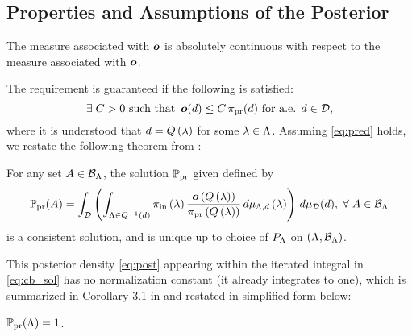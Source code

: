 \subsection{Properties and Assumptions of the Posterior}
\begin{frame}[t]
\begin{assumption}\label{as:pred}
The measure associated with $\operatorname*{\boldsymbol{o}}$ is absolutely continuous with respect to the measure associated with $\operatorname*{\boldsymbol{o}}$.
\end{assumption}


The requirement is guaranteed if the following is satisfied:
\begin{equation}\label{eq:pred}
\exists \; C>0 \text{ such that } \operatorname*{\boldsymbol{o}} (d) \leq C \operatorname*{\pi_{pr}}(d) \text{ for a.e. } d\in \mathcal{D},
\end{equation}
where it is understood that $d = Q\left ( \lambda \right )$ for some $\lambda \in {\Lambda}$.
Assuming \eqref{eq:pred} holds, we restate the following theorem from \cite{BJW18}:
\begin{theorem}
For any set $A\in \mathcal{B}_{{\Lambda}}$, the solution $\operatorname*{\mathbb{P}_{pr}}$ given defined by
\begin{equation}\label{eq:cb_sol}
\operatorname*{\mathbb{P}_{pr}} (A) = \int_{\mathcal{D}} \left (  \int_{{\Lambda} \in Q^{-1}(d)}  \operatorname*{\pi_{in}}\left ( \lambda \right ) \frac{\operatorname*{\boldsymbol{o}}\left ( Q\left ( \lambda \right ) \right )}{\operatorname*{\pi_{pr}}\left ( Q\left ( \lambda \right ) \right )} \, d\mu_{{\Lambda}, d} \left ( \lambda \right ) \right ) \, d\mu_{\mathcal{D}}(d), \; \forall \; A \in \mathcal{B}_{{\Lambda}}
\end{equation} 
is a consistent solution, and is unique up to choice of $P_{\Lambda}$ on $({\Lambda}, \mathcal{B}_{{\Lambda}})$.
\end{theorem}

\end{frame}

\begin{frame}[t]

This posterior density \eqref{eq:post} appearing within the iterated integral in \eqref{eq:cb_sol} has no normalization constant (it already integrates to one), which is summarized in Corollary 3.1 in \cite{BJW18} and restated in simplified form below:
\begin{corollary}\label{cor:int}
$\operatorname*{\mathbb{P}_{pr}}({\Lambda}) = 1$.
\end{corollary}

\end{frame}




